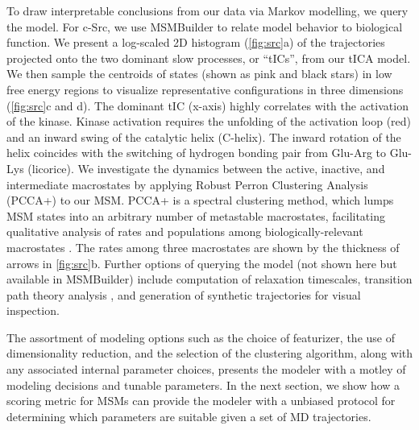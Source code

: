 To draw interpretable conclusions from our data via Markov modelling, we
query the model.  For c-Src, we use MSMBuilder to relate model behavior to
biological function.  We present a log-scaled 2D histogram
(\cref{fig:src}a) of the trajectories projected onto the two dominant slow
processes, or ``tICs'', from our tICA model. We then sample the centroids
of states (shown as pink and black stars) in low free energy regions to
visualize representative configurations in three dimensions \cite{1996-vmd}
(\cref{fig:src}c and d). The dominant tIC (x-axis) highly correlates with
the activation of the kinase. Kinase activation requires the unfolding of
the activation loop (red) and an inward swing of the catalytic helix
(C-helix). The inward rotation of the helix coincides with the switching of
hydrogen bonding pair from Glu-Arg  to Glu-Lys (licorice). We investigate
the dynamics between the active, inactive, and intermediate macrostates by
applying Robust Perron Clustering Analysis (PCCA+) to our MSM. PCCA+ is a
spectral clustering method, which lumps MSM states into an arbitrary number
of metastable macrostates, facilitating qualitative analysis of rates and
populations among biologically-relevant macrostates \cite{2005-pcca}. The
rates among three macrostates are shown by the thickness of arrows in
\cref{fig:src}b. Further options of querying the model (not shown here but
available in MSMBuilder) include computation of relaxation timescales,
transition path theory analysis \cite{Metzner_MMS09, Berezhkovskii_JCP09,
Noe_PNAS09}, and generation of synthetic trajectories for visual
inspection.

The assortment of modeling options such as the choice of featurizer, the
use of dimensionality reduction, and the selection of the clustering
algorithm, along with any associated internal parameter choices, presents
the modeler with a motley of modeling decisions and tunable parameters.
In the next
section, we show how a scoring metric for MSMs can provide the modeler with
a unbiased protocol for determining which parameters are suitable given a
set of MD trajectories.

